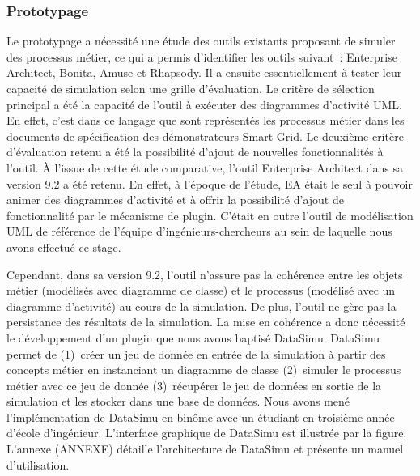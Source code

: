 			\subsubsection{Prototypage}
				Le prototypage a nécessité une étude des outils existants proposant de 
simuler des processus métier, ce qui a permis d'identifier les outils suivant~: 
Enterprise Architect, Bonita, Amuse et Rhapsody. Il a ensuite essentiellement à 
tester leur capacité de simulation selon une grille d'évaluation. Le critère de 
sélection principal a été la capacité de l'outil à exécuter des diagrammes 
d'activité UML. En effet, c'est dans ce langage que sont représentés les 
processus métier dans les documents de spécification des démonstrateurs Smart 
Grid. Le deuxième critère d'évaluation retenu a été la possibilité d'ajout de 
nouvelles fonctionnalités à l'outil. À l'issue de cette étude comparative, 
l'outil Enterprise Architect dans sa version 9.2 a été retenu. En effet, à 
l'époque de l'étude, EA était le seul à pouvoir animer des diagrammes d'activité 
et à offrir la possibilité d'ajout de fonctionnalité par le mécanisme de plugin. 
C'était en outre l'outil de modélisation UML de référence de l'équipe 
d'ingénieurs-chercheurs au sein de laquelle nous avons effectué ce stage.
				
				Cependant, dans sa version 9.2, l'outil n'assure pas la cohérence entre les 
objets métier (modélisés avec diagramme de classe) et le processus (modélisé 
avec un diagramme d'activité) au cours de la simulation. De plus, l'outil ne 
gère pas la persistance des résultats de la simulation. La mise en cohérence a 
donc nécessité le développement d'un plugin que nous avons baptisé DataSimu. 
DataSimu permet de (1)~créer un jeu de donnée en entrée de la simulation à 
partir des concepts métier en instanciant un diagramme de classe (2)~simuler le 
processus métier avec ce jeu de donnée (3)~récupérer le jeu de données en sortie 
de la simulation et les stocker dans une base de données. Nous avons mené 
l'implémentation de DataSimu en binôme avec un étudiant en troisième année 
d'école d'ingénieur. L'interface graphique de DataSimu est illustrée par la 
figure. L'annexe (ANNEXE) détaille l'architecture de DataSimu et présente un 
manuel d'utilisation. 
				
